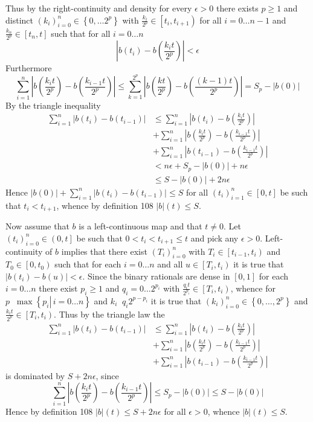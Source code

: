 \documentclass[a4paper]{article}
\newcommand{\obj}[1]{\left\{ #1 \right \}}
\newcommand{\clo}[1]{\left [ #1 \right ]}
\newcommand{\clop}[1]{\left [ #1 \right )}
\newcommand{\ploc}[1]{\left ( #1 \right ]}
\newcommand{\brac}[1]{\left ( #1 \right )}
\newcommand{\induc}[1]{\left . #1 \right \vert}
\newcommand{\abs}[1]{\left | #1 \right |}
\newcommand{\defn}{\mathop{\overset{\Delta}{=}}\nolimits}
\begin{document}
Thus by the right-continuity and density for every $\epsilon>0$ there exists $p\geq1$ and distinct $\brac{k_i}_{i=0}^n\in \obj{0,\ldots 2^p}$ with $\frac{k_i}{2^p}\in \clop{t_i, t_{i+1}}$ for all $i=0\ldots n-1$ and $\frac{k_n}{2^p}\in \clo{t_n,t}$ such that for all $i=0\ldots n$ \[\abs{b\brac{t_i}-b\brac{\frac{k_i t}{2^p}}}<\epsilon\] Furthermore \[\sum_{i=1}^n\abs{b\brac{\frac{k_i t}{2^p}}-b\brac{\frac{k_{i-1} t}{2^p}}} \leq \sum_{k=1}^{2^p}\abs{b\brac{\frac{k t}{2^p}}-b\brac{\frac{\brac{k-1} t}{2^p}}} = S_p - \abs{b\brac{0}}\] By the triangle inequality \begin{align*}\sum_{i=1}^n\abs{b\brac{t_i}-b\brac{t_{i-1}}}&\leq\sum_{i=1}^n\abs{b\brac{t_i}-b\brac{\frac{k_i t}{2^p}}}\\&+\sum_{i=1}^n\abs{b\brac{\frac{k_i t}{2^p}}-b\brac{\frac{k_{i-1} t}{2^p}}}\\&+\sum_{i=1}^n\abs{b\brac{t_{i-1}}-b\brac{\frac{k_{i-1} t}{2^p}}}\\&< n \epsilon + S_p -\abs{b\brac{0}} + n \epsilon\\&\leq S-\abs{b\brac{0}}+2 n \epsilon\end{align*} Hence $\abs{b\brac{0}}+\sum_{i=1}^n\abs{b\brac{t_i}-b\brac{t_{i-1}}}\leq S$ for all $\brac{t_i}_{i=1}^n\in\clo{0,t}$ be such that $t_i<t_{i+1}$, whence by definition 108 $\abs{b}\brac{t}\leq S$.

Now assume that $b$ is a left-continuous map and that $t\neq 0$. Let $\brac{t_i}_{i=0}^n\in\ploc{0,t}$ be such that $0<t_i<t_{i+1}\leq t$ and pick any $\epsilon>0$. Left-continuity of $b$ implies that there exist $\brac{T_i}_{i=0}^n$ with $T_i\in\clop{t_{i-1}, t_i}$ and $T_0\in\clop{0,t_0}$ such that for each $i=0\ldots n$ and all $u\in \clop{T_i,t_i}$ it is true that $\abs{b\brac{t_i}-b\brac{u}}<\epsilon$. Since the binary rationals are dense in $\clo{0,1}$ for each $i=0\ldots n$ there exist $p_i\geq 1$ and $q_i=0\ldots 2^{p_i}$ with $\frac{q_i t}{2^{p_i}}\in \clop{T_i,t_i}$, whence for $p\defn \max\obj{\induc{p_i}\,i=0\ldots n}$ and $k_i\defn q_i 2^{p-p_i}$ it is true that $\brac{k_i}_{i=0}^n\in \obj{0,\ldots,2^p}$ and $\frac{k_i t}{2^p}\in \clop{T_i,t_i}$. Thus by the triangle law the  \begin{align*}\sum_{i=1}^n \abs{b\brac{t_i}-b\brac{t_{i-1}}} &\leq \sum_{i=1}^n \abs{b\brac{t_i}-b\brac{\frac{k_i t}{2^p}}} \\&+ \sum_{i=1}^n \abs{b\brac{\frac{k_i t}{2^p}}-b\brac{\frac{k_{i-1} t}{2^p}}} \\&+ \sum_{i=1}^n \abs{b\brac{t_{i-1}}-b\brac{\frac{k_{i-1} t}{2^p}}} \end{align*} is dominated by $S+2n\epsilon$, since \[\sum_{i=1}^n \abs{b\brac{\frac{k_i t}{2^p}}-b\brac{\frac{k_{i-1} t}{2^p}}}\leq S_p-\abs{b\brac{0}}\leq S-\abs{b\brac{0}}\] Hence by definition 108 $\abs{b}\brac{t}\leq S+2n\epsilon$ for all $\epsilon>0$, whence $\abs{b}\brac{t}\leq S$.\\
\end{document}
